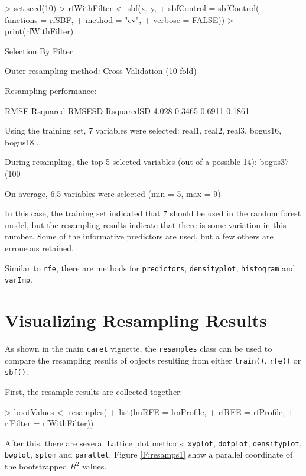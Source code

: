 \documentclass[12pt]{article}
\begin{document}
\begin{Schunk}
\begin{Sinput}
> set.seed(10)
> rfWithFilter <- sbf(x, y,
+                     sbfControl = sbfControl(
+                       functions = rfSBF,
+                       method = "cv",
+                       verbose = FALSE))
> print(rfWithFilter)
\end{Sinput}
\begin{Soutput}
Selection By Filter

Outer resampling method: Cross-Validation (10 fold) 

Resampling performance:

  RMSE Rsquared RMSESD RsquaredSD
 4.028   0.3465 0.6911     0.1861

Using the training set, 7 variables were selected:
   real1, real2, real3, bogus16, bogus18...

During resampling, the top 5 selected variables (out of a possible 14):
   bogus37 (100%), real1 (100%), real3 (100%), real2 (90%), bogus16 (70%)

On average, 6.5 variables were selected (min = 5, max = 9)
\end{Soutput}
\end{Schunk}

In this case, the training set indicated that
7 should be used in the random
forest model, but the resampling results indicate that there is some
variation in this number. Some of the informative predictors are
used, but a few others are erroneous retained.

Similar to \texttt{rfe}, there are methods for \texttt{predictors},
\texttt{densityplot}, \texttt{histogram} and \texttt{varImp}.

\section{Visualizing Resampling Results}

As shown in the main \texttt{caret} vignette, the \texttt{resamples}
class can be used to compare the resampling results of objects
resulting from either \texttt{train()}, \texttt{rfe()} or \texttt{sbf()}.

First, the resample results are collected together:
\begin{Schunk}
\begin{Sinput}
> bootValues <- resamples(
+                         list(lmRFE = lmProfile, 
+                              rfRFE = rfProfile, 
+                              rfFilter = rfWithFilter))
\end{Sinput}
\end{Schunk}
After this, there are several Lattice plot methods: \texttt{xyplot},
\texttt{dotplot}, \texttt{densityplot}, \texttt{bwplot},
\texttt{splom} and \texttt{parallel}. Figure \ref{F:resamps1} show a
parallel coordinate of the bootstrapped $R^2$ values. 
\end{document}
